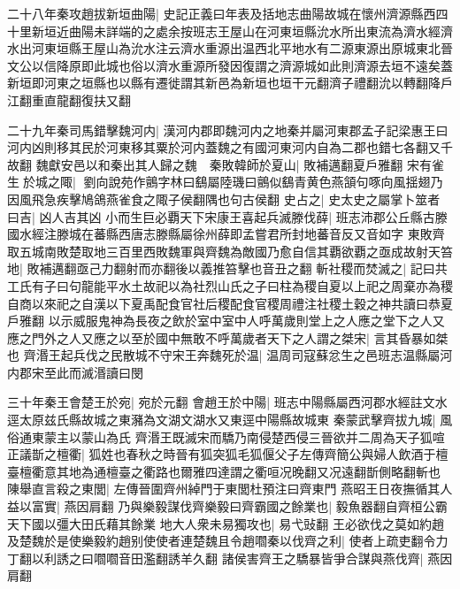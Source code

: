 二十八年秦攻趙拔新垣曲陽|{
	史記正義曰年表及括地志曲陽故城在懷州濟源縣西四十里新垣近曲陽未詳端的之處余按班志王屋山在河東垣縣沇水所出東流為濟水經濟水出河東垣縣王屋山為沇水注云濟水重源出温西北平地水有二源東源出原城東北晉文公以信降原即此城也俗以濟水重源所發因復謂之濟源城如此則濟源去垣不遠矣蓋新垣即河東之垣縣也以縣有遷徙謂其新邑為新垣也垣干元翻濟子禮翻沇以轉翻降戶江翻重直龍翻復扶又翻}


二十九年秦司馬錯擊魏河内|{
	漢河内郡即魏河内之地秦并屬河東郡孟子記梁惠王曰河内凶則移其民於河東移其粟於河内蓋魏之有國河東河内自為二郡也錯七各翻又千故翻}
魏獻安邑以和秦出其人歸之魏　秦敗韓師於夏山|{
	敗補邁翻夏戶雅翻}
宋有雀生於城之陬|{
	劉向說苑作鸇字林曰鷂屬陸璣曰鸇似鷂青黄色燕頷句啄向風揺翅乃因風飛急疾擊鳩鴿燕雀食之陬子侯翻隅也句古侯翻}
史占之|{
	史太史之屬掌卜筮者}
曰吉|{
	凶人吉其凶}
小而生巨必覇天下宋康王喜起兵滅滕伐薛|{
	班志沛郡公丘縣古滕國水經注滕城在蕃縣西唐志滕縣屬徐州薛即孟嘗君所封地蕃音反又音如字}
東敗齊取五城南敗楚取地三百里西敗魏軍與齊魏為敵國乃愈自信其覇欲覇之亟成故射天笞地|{
	敗補邁翻亟己力翻射而亦翻後以義推笞擊也音丑之翻}
斬社稷而焚滅之|{
	記曰共工氏有子曰句龍能平水土故祀以為社烈山氏之子曰柱為稷自夏以上祀之周棄亦為稷自商以來祀之自漢以下夏禹配食官社后稷配食官稷周禮注社稷土穀之神共讀曰恭夏戶雅翻}
以示威服鬼神為長夜之飲於室中室中人呼萬歲則堂上之人應之堂下之人又應之門外之人又應之以至於國中無敢不呼萬歲者天下之人謂之桀宋|{
	言其昏暴如桀也}
齊湣王起兵伐之民散城不守宋王奔魏死於温|{
	温周司寇蘇忿生之邑班志温縣屬河内郡宋至此而滅湣讀曰閔}


三十年秦王會楚王於宛|{
	宛於元翻}
會趙王於中陽|{
	班志中陽縣屬西河郡水經註文水逕太原兹氏縣故城之東瀦為文湖文湖水又東逕中陽縣故城東}
秦蒙武擊齊拔九城|{
	風俗通東蒙主以蒙山為氏}
齊湣王既滅宋而驕乃南侵楚西侵三晉欲并二周為天子狐喧正議斮之檀衢|{
	狐姓也春秋之時晉有狐突狐毛狐偃父子左傳齊簡公與婦人飲酒于檀臺檀衢意其地為通檀臺之衢路也爾雅四達謂之衢咺况晚翻又况遠翻斮側略翻斬也}
陳舉直言殺之東閭|{
	左傳晉圍齊州綽門于東閭杜預注曰齊東門}
燕昭王日夜撫循其人益以富實|{
	燕因肩翻}
乃與樂毅謀伐齊樂毅曰齊霸國之餘業也|{
	毅魚器翻自齊桓公霸天下國以彊大田氏藉其餘業}
地大人衆未易獨攻也|{
	易弋䜴翻}
王必欲伐之莫如約趙及楚魏於是使樂毅約趙别使使者連楚魏且令趙嚪秦以伐齊之利|{
	使者上疏吏翻令力丁翻以利誘之曰嚪嚪音田濫翻誘羊久翻}
諸侯害齊王之驕暴皆爭合謀與燕伐齊|{
	燕因肩翻}


